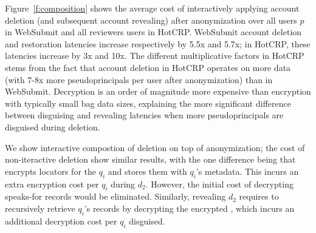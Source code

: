%

Figure~\ref{f:composition} shows the average cost of interactively applying account deletion (and
subsequent account revealing) after anonymization over all users $p$ in WebSubmit and all reviewers
users in HotCRP.
%
WebSubmit account deletion and restoration latencies increase respectively by 5.5x and 5.7x; in
HotCRP, these latencies increase by 3x and 10x.
%
The different multiplicative factors in HotCRP stems from the fact that account deletion in HotCRP
operates on more data (with 7-8x more pseudoprincipals per user after anonymization) than in
WebSubmit. Decryption is an order of magnitude more expensive than encryption with typically small
bag data sizes, explaining the more significant difference between disguising and revealing
latencies when more pseudoprincipals are disguised during deletion.
%

%
We show interactive compostion of deletion on top of anonymization;
the cost of non-iteractive deletion show similar results, with the one difference being that \sys
encrypts locators for the $q_i$ and stores them with $q_i$'s metadata. This incurs an extra
encryption cost per $q_i$ during $d_2$. However, the initial cost of decrypting speaks-for records
would be eliminated.
%
Similarly, revealing $d_2$ requires \sys to recursively retrieve $q_i$'s records by decrypting the
encrypted ,
which incurs an additional decryption cost per $q_i$ disguised.

